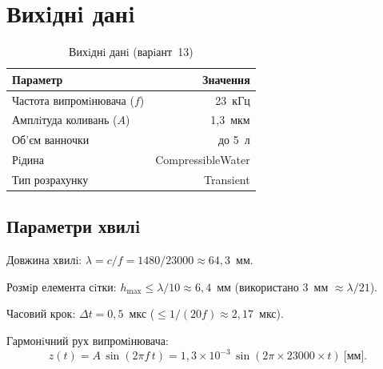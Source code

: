 
\usepackage{../common/labstyle}



\maketitle
\tableofcontents
\newpage

\section{Вихiднi данi}

\begin{table}[H]
  \centering
  \caption{Вихiднi данi (варiант~13)}
  \begin{tabularx}{0.75\textwidth}{Xr}
    \toprule
    \textbf{Параметр} & \textbf{Значення} \\
    \midrule
    Частота випромiнювача ($f$)     & 23~кГц \\
    Амплiтуда коливань ($A$)        & 1{,}3~мкм \\
    Об'єм ванночки                  & до 5~л \\
    Рiдина                          & CompressibleWater \\
    Тип розрахунку                  & Transient \\
    \bottomrule
  \end{tabularx}
\end{table}

\subsection{Параметри хвилi}

Довжина хвилi:
$\lambda = c/f = 1480/23000 \approx 64{,}3$~мм.

Розмiр елемента сiтки: $h_{\max} \leq \lambda/10 \approx 6{,}4$~мм (використано 3~мм $\approx \lambda/21$).

Часовий крок: $\Delta t = 0{,}5$~мкс ($\leq 1/(20f) \approx 2{,}17$~мкс).

Гармонiчний рух випромiнювача:
\begin{equation}
  z(t) = A\,\sin(2\pi f\, t) = 1{,}3 \times 10^{-3}\,\sin(2\pi \times 23000 \times t)~\text{[мм]}.
\end{equation}

